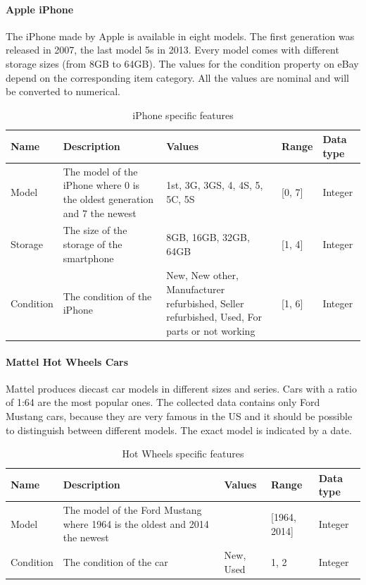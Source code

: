 \paragraph{Apple iPhone}
The iPhone made by Apple is available in eight models. The first generation was released in 2007, the last model 5s in 2013. Every model comes with different storage sizes (from 8GB to 64GB). The values for the condition property on eBay depend on the corresponding item category. All the values are nominal and will be converted to numerical.
\begin{table}[h!]
	\begin{center}
	\begin{tabular}{| p{2.6cm} | p{2.6cm} | p{2.6cm} | p{2.6cm} | p{2.6cm} |}
		\hline
		Name & Description & Values & Range & Data type \\
		\hline
		Model & The model of the iPhone where 0 is the oldest generation and 7 the newest & 1st, 3G, 3GS, 4, 4S, 5, 5C, 5S & [0, 7] & Integer \\
		\hline
		Storage & The size of the storage of the smartphone & 8GB, 16GB, 32GB, 64GB & [1, 4] & Integer \\
		\hline
		Condition & The condition of the iPhone & New, New other, Manufacturer refurbished, Seller refurbished, Used, For parts or not working & [1, 6] & Integer \\
		\hline
	\end{tabular}
	\end{center}
	\caption{iPhone specific features}
\end{table}

\paragraph{Mattel Hot Wheels Cars}
Mattel produces diecast car models in different sizes and series. Cars with a ratio of 1:64 are the most popular ones. The collected data contains only Ford Mustang cars, because they are very famous in the US and it should be possible to distinguish between different models. The exact model is indicated by a date.
\begin{table}[h!]
	\begin{center}
	\begin{tabular}{| p{2.6cm} | p{2.6cm} | p{2.6cm} | p{2.6cm} | p{2.6cm} |}
		\hline
		Name & Description & Values & Range & Data type \\
		\hline
		Model & The model of the Ford Mustang where 1964 is the oldest and 2014 the newest & & [1964, 2014] & Integer \\
		\hline
		Condition & The condition of the car & New, Used & {1, 2} & Integer \\
		\hline
	\end{tabular}
	\end{center}
	\caption{Hot Wheels specific features}
\end{table}

